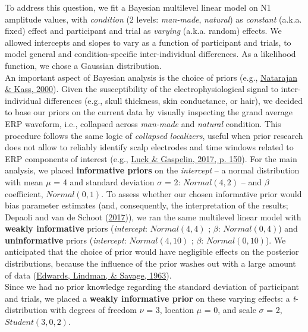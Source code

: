 \documentclass[
  man,floatsintext]{apa6}
\begin{document}
To address this question, we fit a Bayesian multilevel linear model on N1 amplitude values, with \emph{condition} (2 levels: \emph{man-made}, \emph{natural}) as \emph{constant} (a.k.a. fixed) effect and participant and trial as \emph{varying} (a.k.a. random) effects. We allowed intercepts and slopes to vary as a function of participant and trials, to model general and condition-specific inter-individual differences. As a likelihood function, we chose a Gaussian distribution.\\
An important aspect of Bayesian analysis is the choice of priors (e.g., \protect\hyperlink{ref-natarajan2000}{Natarajan \& Kass, 2000}). Given the susceptibility of the electrophysiological signal to inter-individual differences (e.g., skull thickness, skin conductance, or hair), we decided to base our priors on the current data by visually inspecting the grand average ERP waveform, i.e., collapsed across \emph{man-made} and \emph{natural} condition. This procedure follows the same logic of \emph{collapsed localizers}, useful when prior research does not allow to reliably identify scalp electrodes and time windows related to ERP components of interest (e.g., \protect\hyperlink{ref-Luck2017}{Luck \& Gaspelin, 2017, p. 150}). For the main analysis, we placed \textbf{informative priors} on the \emph{intercept} -- a normal distribution with mean \(\mu\) = 4 and standard deviation \(\sigma\) = 2: \(Normal(4,2)\) -- and \(\beta\) coefficient, \(Normal(0,1)\). To assess whether our chosen informative prior would bias parameter estimates (and, consequently, the interpretation of the results; Depaoli and van de Schoot (\protect\hyperlink{ref-depaoli2017}{2017})), we ran the same multilevel linear model with \textbf{weakly informative} priors (\emph{intercept}: \(Normal(4,4)\) ; \(\beta\): \(Normal(0,4)\)) and \textbf{uninformative} priors (\emph{intercept}: \(Normal(4,10)\) ; \(\beta\): \(Normal(0,10)\)). We anticipated that the choice of prior would have negligible effects on the posterior distributions, because the influence of the prior washes out with a large amount of data (\protect\hyperlink{ref-edwards1963}{Edwards, Lindman, \& Savage, 1963}).\\
Since we had no prior knowledge regarding the standard deviation of participant and trials, we placed a \textbf{weakly informative prior} on these varying effects: a \emph{t}-distribution with degrees of freedom \(\nu\) = 3, location \(\mu\) = 0, and scale \(\sigma\) = 2, \(Student(3,0,2)\).\\
\end{document}
